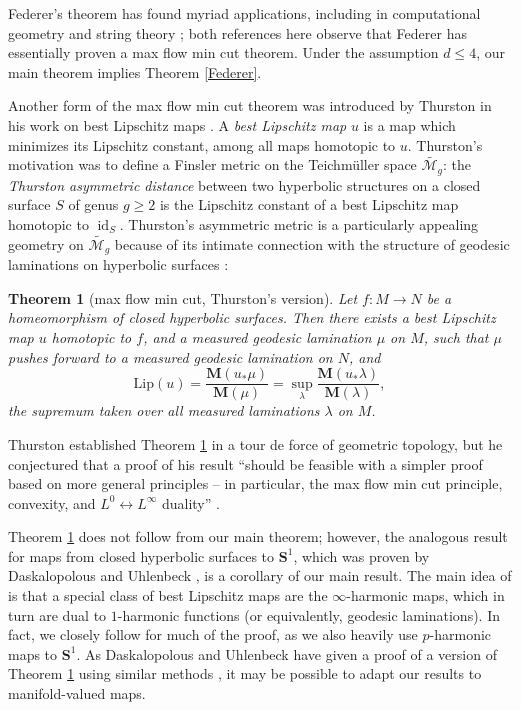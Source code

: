 \documentclass[reqno,11pt]{amsart}
\newcommand{\Sph}{\mathbf S}
\DeclareMathOperator{\id}{id}
\newcommand{\Lip}{\mathrm{Lip}}
\newcommand{\Mass}{\mathbf M}
\newcommand{\dfn}[1]{\emph{#1}\index{#1}}
\newtheorem{theorem}{Theorem}[section]
\theoremstyle{definition}
\numberwithin{equation}{section}
\begin{document}
Federer's theorem has found myriad applications, including in computational geometry \cite{sullivan1990crystalline} and string theory \cite{Freedman_2016}; both references here observe that Federer has essentially proven a max flow min cut theorem.
Under the assumption $d \leq 4$, our main theorem implies Theorem \ref{Federer}.

Another form of the max flow min cut theorem was introduced by Thurston in his work on best Lipschitz maps \cite{Thurston98}.
A \dfn{best Lipschitz map} $u$ is a map which minimizes its Lipschitz constant, among all maps homotopic to $u$.
Thurston's motivation was to define a Finsler metric on the Teichm\"uller space $\widetilde{\mathscr M_g}$: the \dfn{Thurston asymmetric distance} between two hyperbolic structures on a closed surface $S$ of genus $g \geq 2$ is the Lipschitz constant of a best Lipschitz map homotopic to $\id_S$.
Thurston's asymmetric metric is a particularly appealing geometry on $\widetilde{\mathscr M_g}$ because of its intimate connection with the structure of geodesic laminations on hyperbolic surfaces \cite{Thurston98, Gu_ritaud_2017}:

\begin{theorem}[max flow min cut, Thurston's version]\label{existence of thurston lamination}
Let $f: M \to N$ be a homeomorphism of closed hyperbolic surfaces.
Then there exists a best Lipschitz map $u$ homotopic to $f$, and a measured geodesic lamination $\mu$ on $M$, such that $\mu$ pushes forward to a measured geodesic lamination on $N$, and
\begin{equation}\label{L is K}
	\Lip(u) = \frac{\Mass(u_* \mu)}{\Mass(\mu)} = \sup_\lambda \frac{\Mass(u_* \lambda)}{\Mass(\lambda)},
\end{equation}
the supremum taken over all measured laminations $\lambda$ on $M$.
\end{theorem}

Thurston established Theorem \ref{existence of thurston lamination} in a tour de force of geometric topology, but he conjectured that a proof of his result ``should be feasible with a simpler proof based on more general principles -- in particular, the max flow min cut principle, convexity, and $L^0 \leftrightarrow L^\infty$ duality'' \cite[Abstract]{Thurston98}.

Theorem \ref{existence of thurston lamination} does not follow from our main theorem; however, the analogous result for maps from closed hyperbolic surfaces to $\Sph^1$, which was proven by Daskalopolous and Uhlenbeck \cite{daskalopoulos2020transverse}, is a corollary of our main result.
The main idea of \cite{daskalopoulos2020transverse} is that a special class of best Lipschitz maps are the $\infty$-harmonic maps, which in turn are dual to $1$-harmonic functions (or equivalently, geodesic laminations).
In fact, we closely follow \cite{daskalopoulos2020transverse} for much of the proof, as we also heavily use $p$-harmonic maps to $\Sph^1$.
As Daskalopolous and Uhlenbeck have given a proof of a version of Theorem \ref{existence of thurston lamination} using similar methods \cite{daskalopoulos2022,daskalopoulos2023}, it may be possible to adapt our results to manifold-valued maps.
\end{document}
